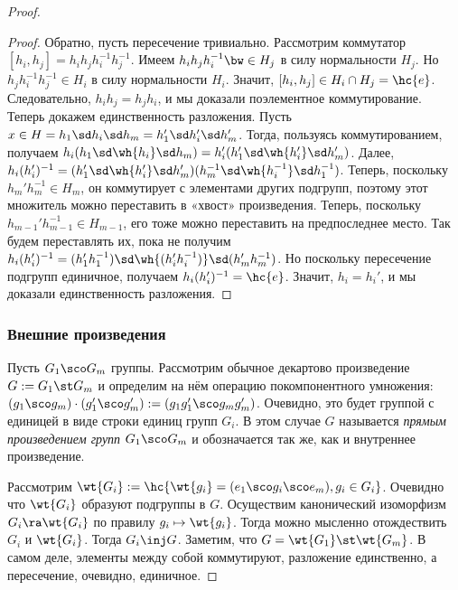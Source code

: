 \documentclass[a4paper]{article}
\begin{document}
\begin{proof}
\begin{proof}
Обратно, пусть пересечение тривиально. Рассмотрим коммутатор  $[h_i, h_j]=h_ih_jh_i^{-1}h_j^{-1}$. Имеем
$h_ih_jh_i^{-1} \bw\in H_j$ в силу нормальности $H_j$. Но $h_jh_i^{-1}h_j^{-1} \in H_i$ в силу нормальности
$H_i$. Значит, $[h_i,h_j] \in H_i \cap H_j = \hc{e}$. Следовательно, $h_ih_j=h_jh_i$, и мы доказали
поэлементное коммутирование. Теперь докажем единственность разложения. Пусть $x \in H = h_1\sd h_i\sd
h_m=h_1'\sd h_i'\sd h_m'$. Тогда, пользуясь коммутированием, получаем $h_i(h_1\sd \wh{h_i}\sd
h_m)=h_i'(h_1'\sd \wh{h_i'}\sd h_m')$. Далее, $h_i(h_i')^{-1}=(h_1'\sd \wh{h_i'}\sd h_m')(h_m^{-1}\sd
\wh{h_i^{-1}}\sd h_1^{-1})$. Теперь, поскольку $h_m'h_m^{-1} \in H_m$, он коммутирует с элементами других
подгрупп, поэтому этот множитель можно переставить в «хвост» произведения. Теперь, поскольку
$h_{m-1}'h_{m-1}^{-1} \in H_{m-1}$, его тоже можно переставить на предпоследнее место. Так будем переставлять
их, пока не получим $h_i(h_i')^{-1}=(h_1'h_1^{-1})\sd \wh{(h_i'h_i^{-1})}\sd (h_m'h_m^{-1})$. Но поскольку
пересечение подгрупп единичное, получаем $h_i(h_i')^{-1}=\hc{e}$. Значит, $h_i=h_i'$, и мы доказали
единственность разложения.
\end{proof}

\subsubsection{Внешние произведения}

\begin{df}
Пусть $G_1\sco G_m$ группы. Рассмотрим обычное декартово произведение $G := G_1\st G_m$ и определим на нём
операцию покомпонентного умножения:  $(g_1\sco g_m)\cdot(g_1'\sco g_m'):=(g_1g_1'\sco g_mg_m')$. Очевидно,
это будет группой с единицей в виде строки единиц групп $G_i$. В этом случае $G$ называется \emph{прямым
произведением групп} $G_1\sco G_m$ и обозначается так же, как и внутреннее произведение.
\end{df}

Рассмотрим $\wt{G_i} := \hc{\wt{g_i}=(e_1\sco g_i\sco e_m), g_i \in G_i}$.  Очевидно что $\wt{G_i}$ образуют
подгруппы в $G$. Осуществим канонический изоморфизм $G_i \ra \wt{G_i}$ по правилу $g_i \mapsto \wt{g_i}$.
Тогда можно мысленно отождествить $G_i$ и $\wt{G_i}$. Тогда $G_i \inj G$. Заметим, что $G=\wt{G_1}\st
\wt{G_m}$. В самом деле, элементы между собой коммутируют, разложение единственно, а пересечение, очевидно,
единичное.


\end{proof}
\end{document}
